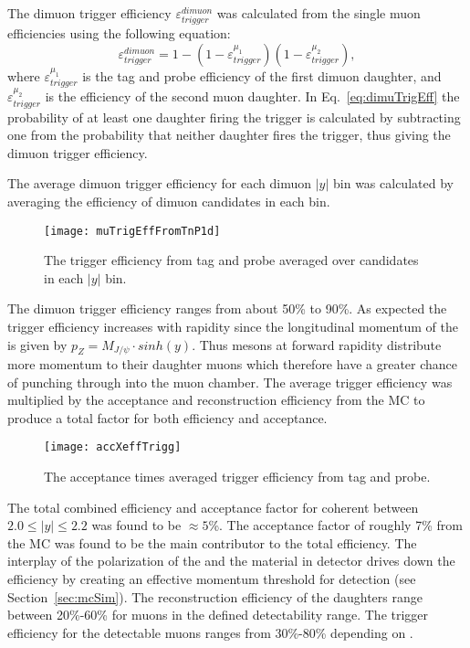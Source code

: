       The dimuon trigger efficiency $\varepsilon^{dimuon}_{trigger}$ was 
        calculated from the single muon efficiencies using the following
        equation:
      \begin{equation}
        \label{eq:dimuTrigEff}
        \varepsilon^{dimuon}_{trigger}=1-(1-\varepsilon_{trigger}^{\mu_{1}})(1-\varepsilon_{trigger}^{\mu_{2}}),
      \end{equation}
      where $\varepsilon_{trigger}^{\mu_{1}}$ is the tag and probe efficiency
        of the first dimuon daughter, and $\varepsilon_{trigger}^{\mu_{2}}$ is
        the efficiency of the second muon daughter. 
      In Eq.~\ref{eq:dimuTrigEff} the probability of at least one daughter
        firing the trigger is calculated by subtracting one from the
        probability that neither daughter fires the trigger,
        thus giving the dimuon trigger efficiency. 

      The average dimuon trigger efficiency for each dimuon $|y|$ bin
        was calculated by averaging the efficiency of dimuon candidates in each
        bin. 
      \begin{figure}[!Hhbt]
        \centering
        \texttt{[image: muTrigEffFromTnP1d]}
        \caption{The trigger efficiency from tag and probe averaged over candidates
          in each $|y|$ bin.}
        \label{fig:triggerEffDiMu}
      \end{figure}
      The dimuon trigger efficiency ranges from about 50\% to 90\%. 
      As expected the \JPsi{} trigger efficiency increases with rapidity since 
        the longitudinal momentum of the \JPsi{} is given by 
        $p_Z= M_{J/\psi} \cdot sinh(y)$. 
      Thus \JPsi{} mesons at forward rapidity distribute more momentum to their
        daughter muons which therefore have a greater chance of punching 
        through into the muon chamber.  
      The average trigger efficiency was multiplied by the acceptance and 
        reconstruction efficiency from the MC to produce a total factor for 
        both efficiency and acceptance. 
      \begin{figure}[!Hhtb]
        \centering
        \texttt{[image: accXeffTrigg]}
        \caption{The acceptance times averaged trigger efficiency from tag and 
          probe.}
        \label{fig:averageExA}
      \end{figure}

      The total combined efficiency and acceptance factor for coherent \JPsi{} 
        between $2.0 \le |y| \le 2.2$ was found to be $\approx 5$\%.
      The acceptance factor of roughly 7\% from the MC was found to be the main
        contributor to the total efficiency. 
      The interplay of the polarization of the \JPsi{} and the material in 
        detector drives down the efficiency by creating an effective momentum 
        threshold for detection (see Section~\ref{sec:mcSim}).
      The reconstruction efficiency of the daughters range between 
        20\%-60\% for muons in the defined detectability range. 
      The trigger efficiency for the detectable muons ranges from 30\%-80\% 
        depending on \pt{}. 

